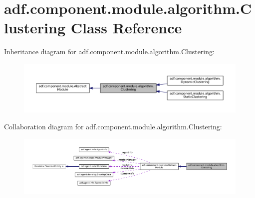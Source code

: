 \hypertarget{classadf_1_1component_1_1module_1_1algorithm_1_1Clustering}{}\section{adf.\+component.\+module.\+algorithm.\+Clustering Class Reference}
\label{classadf_1_1component_1_1module_1_1algorithm_1_1Clustering}


Inheritance diagram for adf.\+component.\+module.\+algorithm.\+Clustering\+:
\nopagebreak
\begin{figure}[H]
\begin{center}
\leavevmode
\includegraphics[width=350pt]{classadf_1_1component_1_1module_1_1algorithm_1_1Clustering__inherit__graph}
\end{center}
\end{figure}


Collaboration diagram for adf.\+component.\+module.\+algorithm.\+Clustering\+:
\nopagebreak
\begin{figure}[H]
\begin{center}
\leavevmode
\includegraphics[width=350pt]{classadf_1_1component_1_1module_1_1algorithm_1_1Clustering__coll__graph}
\end{center}
\end{figure}
